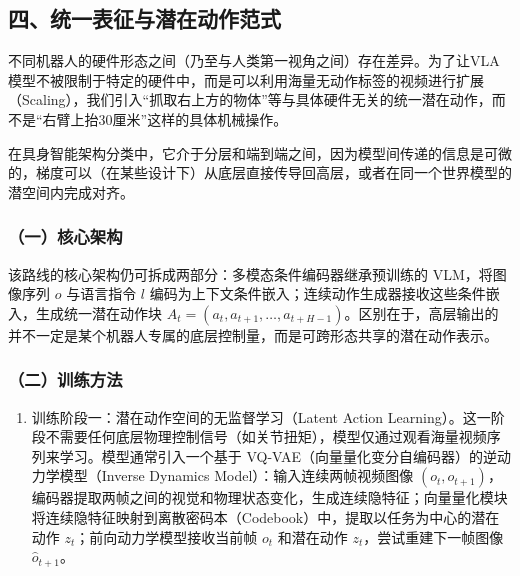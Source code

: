 \hypertarget{ux56dbux7edfux4e00ux8868ux5f81ux4e0eux6f5cux5728ux52a8ux4f5cux8303ux5f0f}{%
\subsection{四、统一表征与潜在动作范式}\label{ux56dbux7edfux4e00ux8868ux5f81ux4e0eux6f5cux5728ux52a8ux4f5cux8303ux5f0f}}

不同机器人的硬件形态之间（乃至与人类第一视角之间）存在差异。为了让VLA模型不被限制于特定的硬件中，而是可以利用海量无动作标签的视频进行扩展（Scaling），我们引入``抓取右上方的物体''等与具体硬件无关的统一潜在动作，而不是``右臂上抬30厘米''这样的具体机械操作。

在具身智能架构分类中，它介于分层和端到端之间，因为模型间传递的信息是可微的，梯度可以（在某些设计下）从底层直接传导回高层，或者在同一个世界模型的潜空间内完成对齐。

\hypertarget{ux4e00ux6838ux5fc3ux67b6ux6784-7}{%
\subsubsection{（一）核心架构}\label{ux4e00ux6838ux5fc3ux67b6ux6784-7}}

该路线的核心架构仍可拆成两部分：多模态条件编码器继承预训练的 VLM，将图像序列 \(o\) 与语言指令 \(l\) 编码为上下文条件嵌入；连续动作生成器接收这些条件嵌入，生成统一潜在动作块 \(A_t=(a_t,a_{t+1},\ldots,a_{t+H-1})\)。区别在于，高层输出的并不一定是某个机器人专属的底层控制量，而是可跨形态共享的潜在动作表示。

\hypertarget{ux4e8cux8badux7ec3ux65b9ux6cd5-1}{%
\subsubsection{（二）训练方法}\label{ux4e8cux8badux7ec3ux65b9ux6cd5-1}}

\begin{enumerate}
\def\labelenumi{\arabic{enumi}.}
\tightlist
\item
  训练阶段一：潜在动作空间的无监督学习（Latent Action Learning）。这一阶段不需要任何底层物理控制信号（如关节扭矩），模型仅通过观看海量视频序列来学习。模型通常引入一个基于 VQ-VAE（向量量化变分自编码器）的逆动力学模型（Inverse Dynamics Model）：输入连续两帧视频图像 \((o_t,o_{t+1})\)，编码器提取两帧之间的视觉和物理状态变化，生成连续隐特征；向量量化模块将连续隐特征映射到离散密码本（Codebook）中，提取以任务为中心的潜在动作 \(z_t\)；前向动力学模型接收当前帧 \(o_t\) 和潜在动作 \(z_t\)，尝试重建下一帧图像 \(\hat{o}_{t+1}\)。
\end{enumerate}

